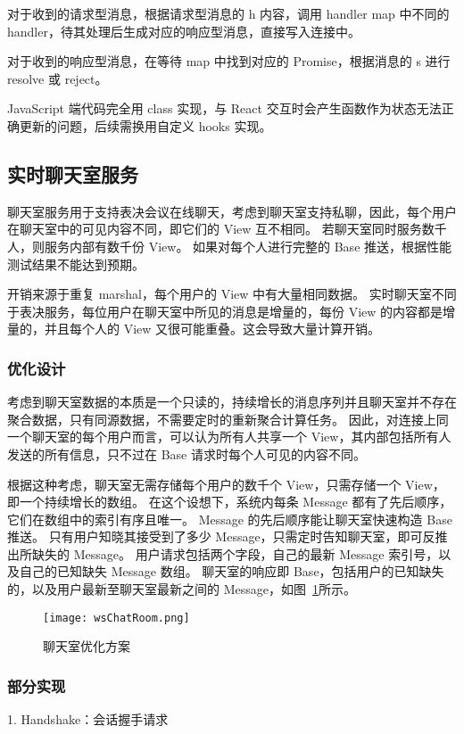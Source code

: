 对于收到的请求型消息，根据请求型消息的 h 内容，调用 handler map 中不同的 handler，待其处理后生成对应的响应型消息，直接写入连接中。

对于收到的响应型消息，在等待 map 中找到对应的 Promise，根据消息的 s 进行 resolve 或 reject。

JavaScript 端代码完全用 class 实现，与 React 交互时会产生函数作为状态无法正确更新的问题，后续需换用自定义 hooks 实现。

\subsection{实时聊天室服务}
聊天室服务用于支持表决会议在线聊天，考虑到聊天室支持私聊，因此，每个用户在聊天室中的可见内容不同，即它们的 View 互不相同。
若聊天室同时服务数千人，则服务内部有数千份 View。
如果对每个人进行完整的 Base 推送，根据性能测试结果不能达到预期。

开销来源于重复 marshal，每个用户的 View 中有大量相同数据。
实时聊天室不同于表决服务，每位用户在聊天室中所见的消息是增量的，每份 View 的内容都是增量的，并且每个人的 View 又很可能重叠。这会导致大量计算开销。

\subsubsection{优化设计}
考虑到聊天室数据的本质是一个只读的，持续增长的消息序列并且聊天室并不存在聚合数据，只有同源数据，不需要定时的重新聚合计算任务。
因此，对连接上同一个聊天室的每个用户而言，可以认为所有人共享一个 View，其内部包括所有人发送的所有信息，只不过在 Base 请求时每个人可见的内容不同。

根据这种考虑，聊天室无需存储每个用户的数千个 View，只需存储一个 View，即一个持续增长的数组。
在这个设想下，系统内每条 Message 都有了先后顺序，它们在数组中的索引有序且唯一。
Message 的先后顺序能让聊天室快速构造 Base 推送。
只有用户知晓其接受到了多少 Message，只需定时告知聊天室，即可反推出所缺失的 Message。
用户请求包括两个字段，自己的最新 Message 索引号，以及自己的已知缺失 Message 数组。
聊天室的响应即 Base，包括用户的已知缺失的，以及用户最新至聊天室最新之间的 Message，如图~\ref{fig:wsChatRoom}所示。
\begin{figure}[!htp]
    \centering
    \texttt{[image: wsChatRoom.png]}
    \caption{聊天室优化方案}
    \label{fig:wsChatRoom}
  \end{figure}

  \subsubsection{部分实现}
  1. Handshake：会话握手请求

